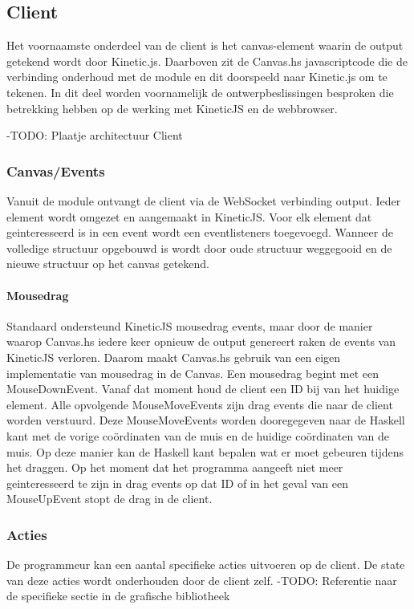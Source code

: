 
\subsection{Client}
Het voornaamste onderdeel van de client is het canvas-element waarin de output getekend wordt door Kinetic.js. Daarboven zit de Canvas.hs javascriptcode die de verbinding onderhoud met de module en dit doorspeeld naar Kinetic.js om te tekenen. In dit deel worden voornamelijk de ontwerpbeslissingen besproken die betrekking hebben op de werking met KineticJS en de webbrowser.

-TODO: Plaatje architectuur Client

\subsubsection{Canvas/Events}
Vanuit de module ontvangt de client via de WebSocket verbinding output. Ieder element wordt omgezet en aangemaakt in KineticJS. Voor elk element dat geinteresseerd is in een event wordt een eventlisteners toegevoegd. Wanneer de volledige structuur opgebouwd is wordt door oude structuur weggegooid en de nieuwe structuur op het canvas getekend.

\paragraph{Mousedrag}
Standaard ondersteund KineticJS mousedrag events, maar door de manier waarop Canvas.hs iedere keer opnieuw de output genereert raken de events van KineticJS verloren. Daarom maakt Canvas.hs gebruik van een eigen implementatie van mousedrag in de Canvas. Een mousedrag begint met een MouseDownEvent. Vanaf dat moment houd de client een ID bij van het huidige element. Alle opvolgende MouseMoveEvents zijn drag events die naar de client worden verstuurd. Deze MouseMoveEvents worden dooregegeven naar de Haskell kant met de vorige coördinaten van de muis en de huidige coördinaten van de muis.
Op deze manier kan de Haskell kant bepalen wat er moet gebeuren tijdens het draggen. Op het moment dat het programma aangeeft niet meer geinteresseerd te zijn in drag events op dat ID of in het geval van een MouseUpEvent stopt de drag in de client.

\subsubsection{Acties}
De programmeur kan een aantal specifieke acties uitvoeren op de client. De state van deze acties wordt onderhouden door de client zelf.
-TODO: Referentie naar de specifieke sectie in de grafische bibliotheek

